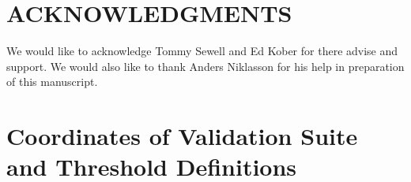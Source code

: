 \documentclass[prb,aps,nobibnotes,twocolumn,doublespace,twocolumngrid,superbib]{revtex4}
\begin{document}

\section*{ACKNOWLEDGMENTS}

We would like to acknowledge Tommy Sewell and Ed Kober for there advise
and support. We would also like to thank Anders Niklasson for his help
in preparation of this manuscript. 


 
 


\appendix

\section{Coordinates of Validation Suite and Threshold Definitions}\label{Coordinates}
%
%
%
\begin{table}[ht]
\caption{Fractional coordinates for the triclinic 2 atom unit cell of MgO, cooresponding to the 
         calculations reported in Table~\ref{MgOTable}.  Length of the unit cell is 
         $a=b=c=2.977776807$\AA $\,$ with angles $\alpha=\beta=\gamma=60^\circ$.}
\end{table}
\end{document}
